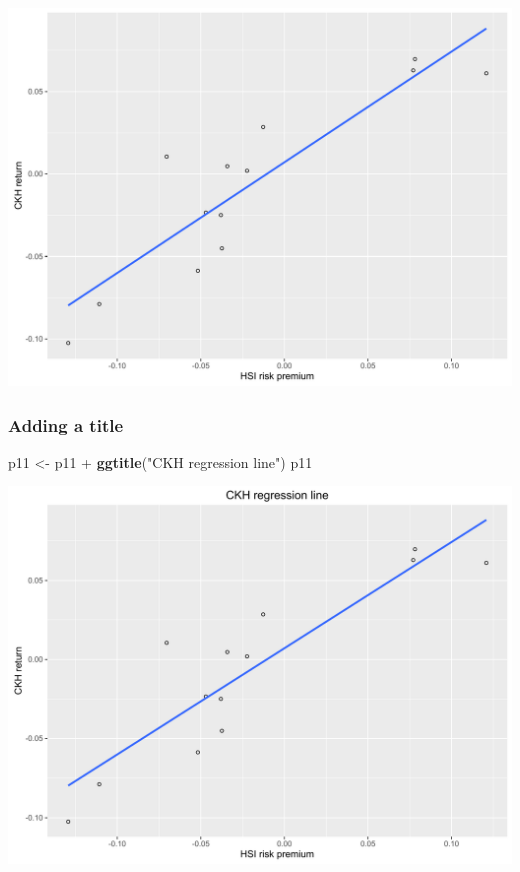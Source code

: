 \documentclass[]{article}
\newenvironment{Shaded}{\begin{snugshade}}{\end{snugshade}}
\newcommand{\KeywordTok}[1]{\textcolor[rgb]{0.13,0.29,0.53}{\textbf{{#1}}}}
\newcommand{\StringTok}[1]{\textcolor[rgb]{0.31,0.60,0.02}{{#1}}}
\newcommand{\NormalTok}[1]{{#1}}
\begin{document}
\begin{center}\includegraphics{0_all_posts_pdf/lr_8-1} \end{center}

\subsubsection{Adding a title}\label{adding-a-title-4}

\begin{Shaded}
\begin{Highlighting}[]
\NormalTok{p11 <-}\StringTok{ }\NormalTok{p11 +}\StringTok{ }\KeywordTok{ggtitle}\NormalTok{(}\StringTok{"CKH regression line"}\NormalTok{)}
\NormalTok{p11}
\end{Highlighting}
\end{Shaded}

\begin{center}\includegraphics{0_all_posts_pdf/lr_9-1} \end{center}
\end{document}
